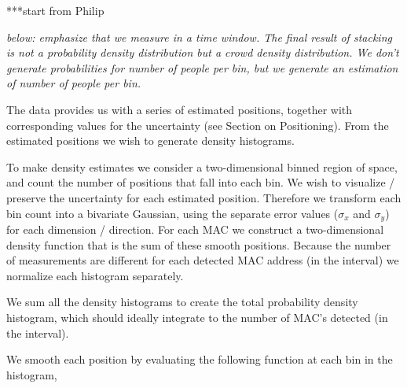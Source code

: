 \documentclass[10pt,a4paper]{article}
\begin{document}
***start from Philip

{\it below: emphasize that we measure in a time window. The final result of stacking is not a probability density distribution but a crowd density distribution. We don't generate probabilities for number of people per bin, but we generate an estimation of number of people per bin. }

The data provides us with a series of estimated positions, together with corresponding values for the uncertainty (see Section on Positioning).
From the estimated positions we wish to generate density histograms.

To make density estimates we consider a two-dimensional binned region of space, and count the number of positions that fall into each bin.
We wish to visualize / preserve the uncertainty for each estimated position.
Therefore we transform each bin count into a bivariate Gaussian, using the separate error values ($\sigma_{x}$ and $\sigma_{y}$) for each dimension / direction.
For each MAC we construct a two-dimensional density function that is the sum of these smooth positions.
Because the number of measurements are different for each detected MAC address (in the interval) we normalize each histogram separately.

We sum all the density histograms to create the total probability density histogram, which should ideally integrate to the number of MAC's detected (in the interval).

We smooth each position by evaluating the following function at each bin in the histogram, 
\end{document}

